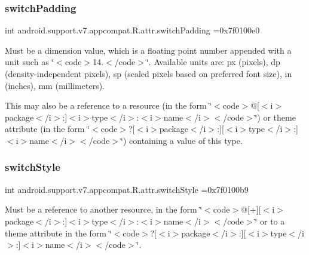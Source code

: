 \subsubsection{\texorpdfstring{switch\+Padding}{switchPadding}}
{\footnotesize\ttfamily int android.\+support.\+v7.\+appcompat.\+R.\+attr.\+switch\+Padding =0x7f0100e0\hspace{0.3cm}{\ttfamily [static]}}

Must be a dimension value, which is a floating point number appended with a unit such as \char`\"{}$<$code$>$14.\+5sp$<$/code$>$\char`\"{}. Available units are\+: px (pixels), dp (density-\/independent pixels), sp (scaled pixels based on preferred font size), in (inches), mm (millimeters). 

This may also be a reference to a resource (in the form \char`\"{}$<$code$>$@\mbox{[}$<$i$>$package$<$/i$>$\+:\mbox{]}$<$i$>$type$<$/i$>$\+:$<$i$>$name$<$/i$>$$<$/code$>$\char`\"{}) or theme attribute (in the form \char`\"{}$<$code$>$?\mbox{[}$<$i$>$package$<$/i$>$\+:\mbox{]}\mbox{[}$<$i$>$type$<$/i$>$\+:\mbox{]}$<$i$>$name$<$/i$>$$<$/code$>$\char`\"{}) containing a value of this type. \mbox{\label{classandroid_1_1support_1_1v7_1_1appcompat_1_1R_1_1attr_aa7ea181c951ce6ec2cc6cbbb8d368909}} 
\subsubsection{\texorpdfstring{switch\+Style}{switchStyle}}
{\footnotesize\ttfamily int android.\+support.\+v7.\+appcompat.\+R.\+attr.\+switch\+Style =0x7f0100b9\hspace{0.3cm}{\ttfamily [static]}}

Must be a reference to another resource, in the form \char`\"{}$<$code$>$@\mbox{[}+\mbox{]}\mbox{[}$<$i$>$package$<$/i$>$\+:\mbox{]}$<$i$>$type$<$/i$>$\+:$<$i$>$name$<$/i$>$$<$/code$>$\char`\"{} or to a theme attribute in the form \char`\"{}$<$code$>$?\mbox{[}$<$i$>$package$<$/i$>$\+:\mbox{]}\mbox{[}$<$i$>$type$<$/i$>$\+:\mbox{]}$<$i$>$name$<$/i$>$$<$/code$>$\char`\"{}. \mbox{\label{classandroid_1_1support_1_1v7_1_1appcompat_1_1R_1_1attr_a916b122ead6607d761f230b3b85f3f71}} 
